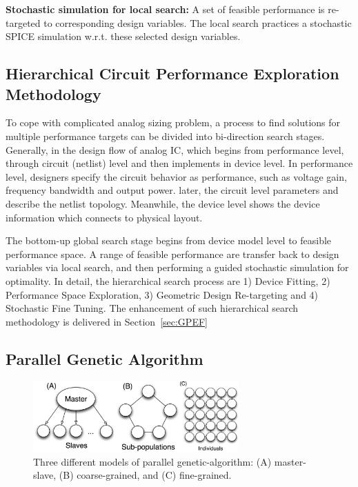       \begin{defi}
        {\bf Stochastic simulation for local search:} A set of feasible performance is re-targeted to corresponding design variables. The local search practices a stochastic SPICE simulation w.r.t. these selected design variables. 
      \end{defi}
    \subsection{Hierarchical Circuit Performance Exploration Methodology\cite{PerfMap_ISQED2011}}
      To cope with complicated analog sizing problem, a process to find solutions for multiple performance targets can be divided into bi-direction search stages. Generally, in the design flow of analog IC, which begins from performance level, through circuit (netlist) level and then implements in device level. In performance level, designers specify the circuit behavior as performance, such as voltage gain, frequency bandwidth and output power. later, the circuit level parameters and describe the netlist topology. Meanwhile, the device level shows the device information which connects to physical layout. 

      The bottom-up global search stage begins from device model level to feasible performance space. A range of feasible performance are transfer back to design variables via local search, and then performing a guided stochastic simulation for optimality. In detail, the hierarchical search process are 1) Device Fitting, 2) Performance Space Exploration, 3) Geometric Design Re-targeting and 4) Stochastic Fine Tuning. The enhancement of such hierarchical search methodology is delivered in Section~\ref{sec:GPEF}
    \subsection{Parallel Genetic Algorithm}
      \begin{figure}[t]
        \centering
        \centerline{
          \includegraphics[width=0.7\textwidth]{Fig/Chapter2/PGA_reduced.eps}
        }
        \caption{Three different models of parallel genetic-algorithm: (A) master-slave, (B) coarse-grained, and (C) fine-grained.}
        \label{fig:PGA}
        \end{figure}

